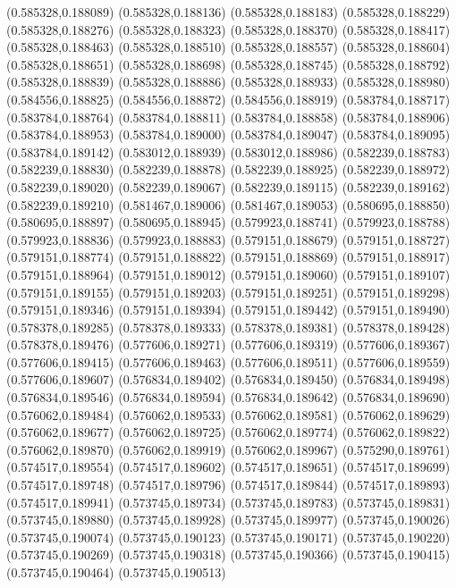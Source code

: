 (0.585328,0.188089)
(0.585328,0.188136)
(0.585328,0.188183)
(0.585328,0.188229)
(0.585328,0.188276)
(0.585328,0.188323)
(0.585328,0.188370)
(0.585328,0.188417)
(0.585328,0.188463)
(0.585328,0.188510)
(0.585328,0.188557)
(0.585328,0.188604)
(0.585328,0.188651)
(0.585328,0.188698)
(0.585328,0.188745)
(0.585328,0.188792)
(0.585328,0.188839)
(0.585328,0.188886)
(0.585328,0.188933)
(0.585328,0.188980)
(0.584556,0.188825)
(0.584556,0.188872)
(0.584556,0.188919)
(0.583784,0.188717)
(0.583784,0.188764)
(0.583784,0.188811)
(0.583784,0.188858)
(0.583784,0.188906)
(0.583784,0.188953)
(0.583784,0.189000)
(0.583784,0.189047)
(0.583784,0.189095)
(0.583784,0.189142)
(0.583012,0.188939)
(0.583012,0.188986)
(0.582239,0.188783)
(0.582239,0.188830)
(0.582239,0.188878)
(0.582239,0.188925)
(0.582239,0.188972)
(0.582239,0.189020)
(0.582239,0.189067)
(0.582239,0.189115)
(0.582239,0.189162)
(0.582239,0.189210)
(0.581467,0.189006)
(0.581467,0.189053)
(0.580695,0.188850)
(0.580695,0.188897)
(0.580695,0.188945)
(0.579923,0.188741)
(0.579923,0.188788)
(0.579923,0.188836)
(0.579923,0.188883)
(0.579151,0.188679)
(0.579151,0.188727)
(0.579151,0.188774)
(0.579151,0.188822)
(0.579151,0.188869)
(0.579151,0.188917)
(0.579151,0.188964)
(0.579151,0.189012)
(0.579151,0.189060)
(0.579151,0.189107)
(0.579151,0.189155)
(0.579151,0.189203)
(0.579151,0.189251)
(0.579151,0.189298)
(0.579151,0.189346)
(0.579151,0.189394)
(0.579151,0.189442)
(0.579151,0.189490)
(0.578378,0.189285)
(0.578378,0.189333)
(0.578378,0.189381)
(0.578378,0.189428)
(0.578378,0.189476)
(0.577606,0.189271)
(0.577606,0.189319)
(0.577606,0.189367)
(0.577606,0.189415)
(0.577606,0.189463)
(0.577606,0.189511)
(0.577606,0.189559)
(0.577606,0.189607)
(0.576834,0.189402)
(0.576834,0.189450)
(0.576834,0.189498)
(0.576834,0.189546)
(0.576834,0.189594)
(0.576834,0.189642)
(0.576834,0.189690)
(0.576062,0.189484)
(0.576062,0.189533)
(0.576062,0.189581)
(0.576062,0.189629)
(0.576062,0.189677)
(0.576062,0.189725)
(0.576062,0.189774)
(0.576062,0.189822)
(0.576062,0.189870)
(0.576062,0.189919)
(0.576062,0.189967)
(0.575290,0.189761)
(0.574517,0.189554)
(0.574517,0.189602)
(0.574517,0.189651)
(0.574517,0.189699)
(0.574517,0.189748)
(0.574517,0.189796)
(0.574517,0.189844)
(0.574517,0.189893)
(0.574517,0.189941)
(0.573745,0.189734)
(0.573745,0.189783)
(0.573745,0.189831)
(0.573745,0.189880)
(0.573745,0.189928)
(0.573745,0.189977)
(0.573745,0.190026)
(0.573745,0.190074)
(0.573745,0.190123)
(0.573745,0.190171)
(0.573745,0.190220)
(0.573745,0.190269)
(0.573745,0.190318)
(0.573745,0.190366)
(0.573745,0.190415)
(0.573745,0.190464)
(0.573745,0.190513)
